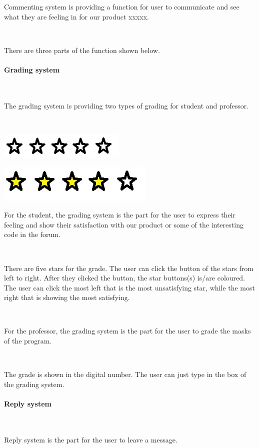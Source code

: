 Commenting system is providing a function for user to communicate and see what they are feeling in for our product xxxxx.\par~

There are three parts of the function shown below.

\paragraph{Grading system}~

The grading system is providing two types of grading for student and professor.\par~

\includegraphics[scale=0.7]{Doc/Graphics/0star}

\includegraphics[scale=0.56]{Doc/Graphics/4star}

For the student, the grading system is the part for the user to express their feeling and show their satisfaction with our product or some of the interesting code in the forum.\par~

There are five stars for the grade. The user can click the button of the stars from left to right. After they clicked the button, the star buttons(s) is/are coloured. The user can click the most left that is the most unsatisfying star, while the most right that is showing the most satisfying.\par~

For the professor, the grading system is the part for the user to grade the masks of the program.\par~

The grade is shown in the digital number. The user can just type in the box of the grading system.

\paragraph{Reply system}~

Reply system is the part for the user to leave a message.\par~

